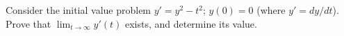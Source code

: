 Consider the initial value problem $y' = y^2 - t^2$; $y(0) = 0$ (where $y' =
dy/dt$). Prove that $\displaystyle{\lim_{t \to \infty} y'(t)}$ exists, and
determine its value.
